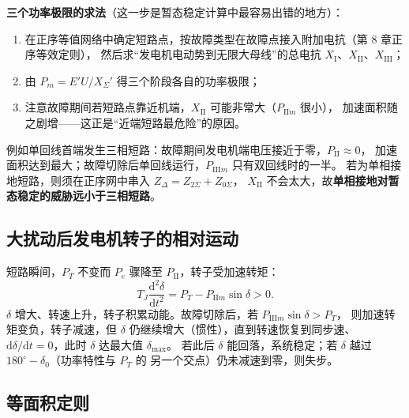\textbf{三个功率极限的求法}（这一步是暂态稳定计算中最容易出错的地方）：
\begin{enumerate}
  \item 在正序等值网络中确定短路点，按故障类型在故障点接入附加电抗（第 8 章正序等效定则），
        然后求“发电机电动势到无限大母线”的总电抗 $X_{\text{I}}$、$X_{\text{II}}$、$X_{\text{III}}$；
  \item 由 $P_{m}=E'U/X_{\Sigma}'$ 得三个阶段各自的功率极限；
  \item 注意故障期间若短路点靠近机端，$X_{\text{II}}$ 可能非常大（$P_{\text{II}m}$ 很小），
        加速面积随之剧增——这正是“近端短路最危险”的原因。
\end{enumerate}
例如单回线首端发生三相短路：故障期间发电机端电压接近于零，$P_{\text{II}}\approx0$，
加速面积达到最大；故障切除后单回线运行，$P_{\text{III}m}$ 只有双回线时的一半。
若为单相接地短路，则须在正序网中串入 $Z_{\Delta}=Z_{2\Sigma}+Z_{0\Sigma}$，
$X_{\text{II}}$ 不会太大，故\textbf{单相接地对暂态稳定的威胁远小于三相短路}。

\subsection{大扰动后发电机转子的相对运动}

短路瞬间，$P_T$ 不变而 $P_e$ 骤降至 $P_{\text{II}}$，转子受加速转矩：
\begin{equation}
  T_J\frac{\mathrm{d}^{2}\delta}{\mathrm{d}t^{2}}=P_T-P_{\text{II}m}\sin\delta>0 .
\end{equation}
$\delta$ 增大、转速上升，转子积累动能。故障切除后，若 $P_{\text{III}m}\sin\delta>P_T$，
则加速转矩变负，转子减速，但 $\delta$ 仍继续增大（惯性），直到转速恢复到同步速、
$\mathrm{d}\delta/\mathrm{d}t=0$，此时 $\delta$ 达最大值 $\delta_{\max}$。
若此后 $\delta$ 能回落，系统稳定；若 $\delta$ 越过 $180^\circ-\delta_0$（功率特性与 $P_T$ 的
另一个交点）仍未减速到零，则失步。

\subsection{等面积定则}

